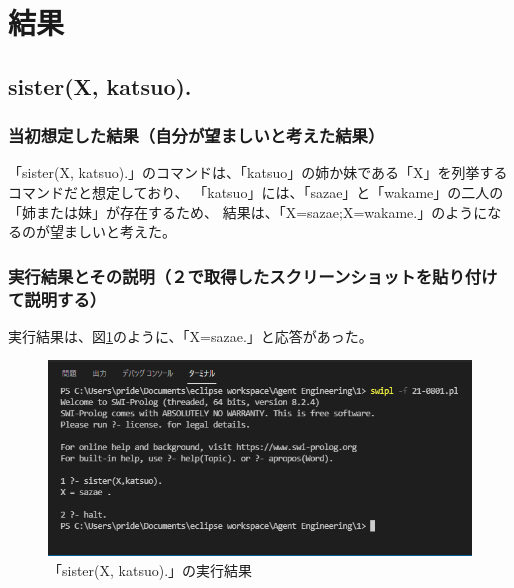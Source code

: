 \section{結果}
\subsection{sister(X, katsuo).}
\subsubsection{当初想定した結果（自分が望ましいと考えた結果）}
「sister(X, katsuo).」のコマンドは、「katsuo」の姉か妹である「X」を列挙するコマンドだと想定しており、
「katsuo」には、「sazae」と「wakame」の二人の「姉または妹」が存在するため、
結果は、「X=sazae;X=wakame.」のようになるのが望ましいと考えた。

\subsubsection{実行結果とその説明（２で取得したスクリーンショットを貼り付けて説明する）}
実行結果は、図\ref{graph:1}のように、「X=sazae.」と応答があった。
\begin{figure}[hbtp]
  \centering
  \caption{「sister(X, katsuo).」の実行結果}
  \label{graph:1}
  \includegraphics[scale = 0.7]{21-0801-01.png}
\end{figure}

